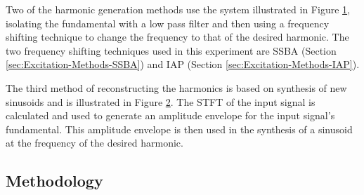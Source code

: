 		Two of the harmonic generation methods use the system illustrated in Figure \ref{fig:FilterAndShift},
		isolating the fundamental with a low pass filter and then using a frequency shifting technique to change the
		frequency to that of the desired harmonic. The two frequency shifting techniques used in this experiment are
		SSBA (Section \ref{sec:Excitation-Methods-SSBA}) and IAP (Section \ref{sec:Excitation-Methods-IAP}).

		\begin{figure}[h!]
			\centering
			\caption{}
			\label{fig:FilterAndShift}
		\end{figure}

		The third method of reconstructing the harmonics is based on synthesis of new sinusoids and is illustrated
		in Figure \ref{fig:Synthesise}. The STFT of the input signal is calculated and used to generate an amplitude
		envelope for the input signal's fundamental. This amplitude envelope is then used in the synthesis of a
		sinusoid at the frequency of the desired harmonic.

		\begin{figure}[h!]
			\centering
			\caption{}
			\label{fig:Synthesise}
		\end{figure}

	\subsection{Methodology}
	\label{sec:PerceptualExperiments-Reconstruction-Methodology}
